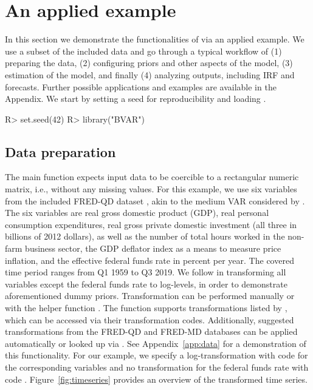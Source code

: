 \documentclass[article,nojss]{jss} %
\begin{document}
\section{An applied example} \label{sec:demo}

In this section we demonstrate the functionalities of  via an applied example. We use a subset of the included data and go through a typical workflow of (1) preparing the data, (2) configuring priors and other aspects of the model, (3) estimation of the model, and finally (4) analyzing outputs, including IRF and forecasts. Further possible applications and examples are available in the Appendix.
We start by setting a seed for reproducibility and loading .

\begin{Schunk}
\begin{Sinput}
R> set.seed(42)
R> library("BVAR")
\end{Sinput}
\end{Schunk}

\subsection{Data preparation} \label{subsec:data}

The main function  expects input data to be coercible to a rectangular numeric matrix, i.e., without any missing values. For this example, we use six variables from the included FRED-QD dataset \citep{mccracken2016}, akin to the medium VAR considered by \cite{giannone2015}.
The six variables are real gross domestic product (GDP), real personal consumption expenditures, real gross private domestic investment (all three in billions of 2012 dollars), as well as the number of total hours worked in the non-farm business sector, the GDP deflator index as a means to measure price inflation, and the effective federal funds rate in percent per year. The covered time period ranges from Q1 1959 to Q3 2019.
We follow \cite{giannone2015} in transforming all variables except the federal funds rate to log-levels, in order to demonstrate aforementioned dummy priors.
Transformation can be performed manually or with the helper function . The function supports transformations listed by \cite{mccracken2016}, which can be accessed via their transformation codes. Additionally, suggested transformations from the FRED-QD and FRED-MD databases can be applied automatically or looked up via . See Appendix~\ref{app:data} for a demonstration of this functionality.
For our example, we specify a log-transformation with code  for the corresponding variables and no transformation for the federal funds rate with code .
Figure~\ref{fig:timeseries} provides an overview of the transformed time series.
\end{document}
